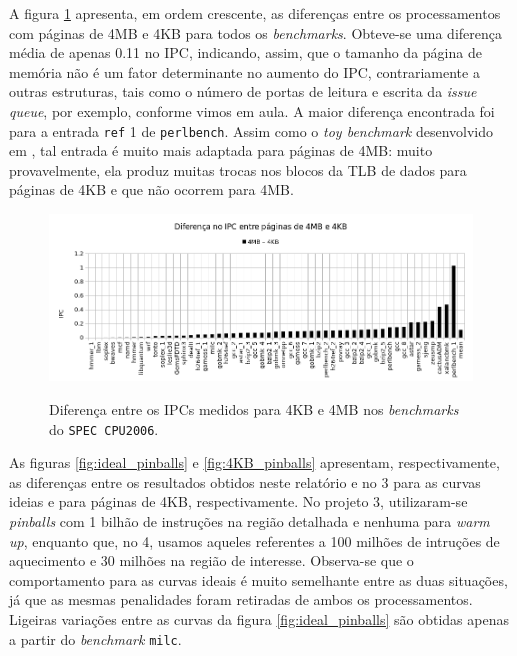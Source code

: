 \documentclass[12pt]{article}
\begin{document}
A figura \ref{fig:diferenca-result} apresenta, em ordem crescente, as diferenças
entre os processamentos com páginas de 4MB e 4KB para todos os
\textit{benchmarks}. Obteve-se uma diferença média de apenas 0.11 no IPC,
indicando, assim, que o tamanho da página de memória não é um fator determinante
no aumento do IPC, contrariamente a outras estruturas, tais como o número de
portas de leitura e escrita da \textit{issue queue}, por exemplo, conforme
vimos em aula. A maior diferença encontrada foi para a entrada \texttt{ref} 1 de
\texttt{perlbench}. Assim como o \textit{toy benchmark} desenvolvido em
\cite{relatorio2}, tal entrada é muito mais adaptada para páginas de 4MB: muito
provavelmente, ela produz muitas trocas nos blocos da TLB de dados para páginas
de 4KB e que não ocorrem para 4MB.

\begin{figure}[h!]
  \centering
  \includegraphics[width=\textwidth]{img/diferenca}%
  \label{fig:diferenca-result}%
  \caption{Diferença entre os IPCs medidos para 4KB e 4MB nos
  \textit{benchmarks} do \texttt{SPEC CPU2006}.}
\end{figure}

As figuras \ref{fig:ideal_pinballs} e \ref{fig:4KB_pinballs} apresentam,
respectivamente, as diferenças entre os resultados obtidos neste relatório e no
3 \cite{relatorio3} para as curvas ideias e para páginas de 4KB,
respectivamente. No projeto 3, utilizaram-se \textit{pinballs} com 1 bilhão de
instruções na região detalhada e nenhuma para \textit{warm up}, enquanto que,
no 4, usamos aqueles referentes a 100 milhões de intruções de aquecimento e 30
milhões na região de interesse. Observa-se que o comportamento para as curvas
ideais é muito semelhante entre as duas situações, já que as mesmas penalidades
foram retiradas de ambos os processamentos. Ligeiras variações entre as curvas da
figura \ref{fig:ideal_pinballs} são obtidas apenas a partir do
\textit{benchmark} \texttt{milc}.
\end{document}
